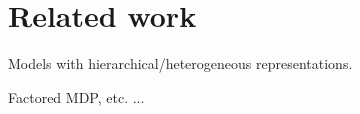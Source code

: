 \section{Related work}

Models with hierarchical/heterogeneous representations.

Factored MDP, etc. ...

